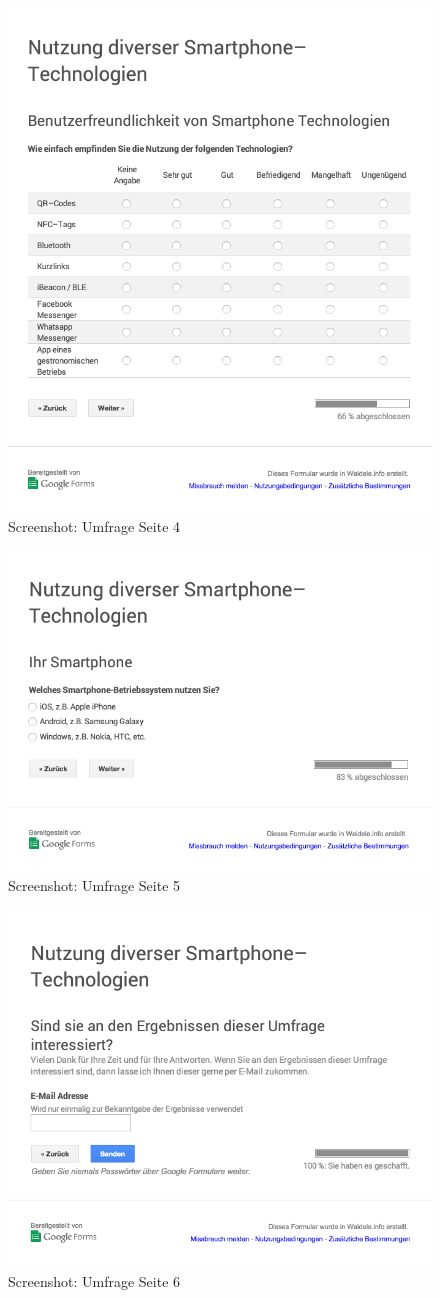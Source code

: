 \begin{figure}[H]
\begin{center}
\includegraphics[width=.6\textwidth]{Umfrage-S4.png}
\caption{Screenshot: Umfrage Seite 4}
\label{pic:us4}
\end{center}
\end{figure}

\begin{figure}[H]
\begin{center}
\includegraphics[width=.6\textwidth]{Umfrage-S5.png}
\caption{Screenshot: Umfrage Seite 5}
\label{pic:us5}
\end{center}
\end{figure}

\begin{figure}[H]
\begin{center}
\includegraphics[width=.6\textwidth]{Umfrage-S6.png}
\caption{Screenshot: Umfrage Seite 6}
\label{pic:us6}
\end{center}
\end{figure}

